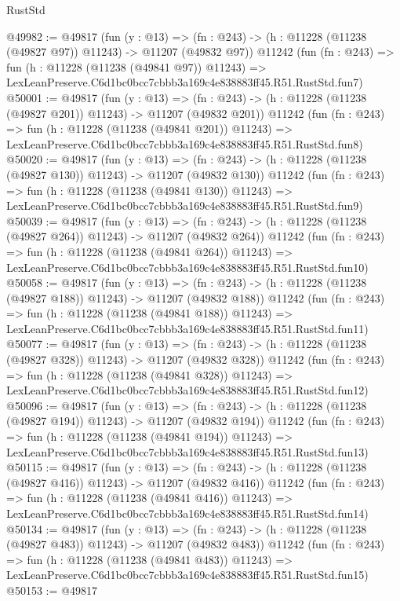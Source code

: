 \begin{lexlean}{RustStd}
\begin{coremodule}
@49982 := @49817
    (fun (y : @13) =>
    (fn : @243) -> (h : @11228 (@11238 (@49827 @97)) @11243) -> @11207 (@49832 @97))
    @11242
    (fun (fn : @243) =>
    fun (h : @11228 (@11238 (@49841 @97)) @11243) =>
    LexLeanPreserve.C6d1bc0bcc7cbbb3a169c4e838883ff45.R51.RustStd.fun7)
@50001 := @49817
    (fun (y : @13) =>
    (fn : @243) -> (h : @11228 (@11238 (@49827 @201)) @11243) -> @11207 (@49832 @201))
    @11242
    (fun (fn : @243) =>
    fun (h : @11228 (@11238 (@49841 @201)) @11243) =>
    LexLeanPreserve.C6d1bc0bcc7cbbb3a169c4e838883ff45.R51.RustStd.fun8)
@50020 := @49817
    (fun (y : @13) =>
    (fn : @243) -> (h : @11228 (@11238 (@49827 @130)) @11243) -> @11207 (@49832 @130))
    @11242
    (fun (fn : @243) =>
    fun (h : @11228 (@11238 (@49841 @130)) @11243) =>
    LexLeanPreserve.C6d1bc0bcc7cbbb3a169c4e838883ff45.R51.RustStd.fun9)
@50039 := @49817
    (fun (y : @13) =>
    (fn : @243) -> (h : @11228 (@11238 (@49827 @264)) @11243) -> @11207 (@49832 @264))
    @11242
    (fun (fn : @243) =>
    fun (h : @11228 (@11238 (@49841 @264)) @11243) =>
    LexLeanPreserve.C6d1bc0bcc7cbbb3a169c4e838883ff45.R51.RustStd.fun10)
@50058 := @49817
    (fun (y : @13) =>
    (fn : @243) -> (h : @11228 (@11238 (@49827 @188)) @11243) -> @11207 (@49832 @188))
    @11242
    (fun (fn : @243) =>
    fun (h : @11228 (@11238 (@49841 @188)) @11243) =>
    LexLeanPreserve.C6d1bc0bcc7cbbb3a169c4e838883ff45.R51.RustStd.fun11)
@50077 := @49817
    (fun (y : @13) =>
    (fn : @243) -> (h : @11228 (@11238 (@49827 @328)) @11243) -> @11207 (@49832 @328))
    @11242
    (fun (fn : @243) =>
    fun (h : @11228 (@11238 (@49841 @328)) @11243) =>
    LexLeanPreserve.C6d1bc0bcc7cbbb3a169c4e838883ff45.R51.RustStd.fun12)
@50096 := @49817
    (fun (y : @13) =>
    (fn : @243) -> (h : @11228 (@11238 (@49827 @194)) @11243) -> @11207 (@49832 @194))
    @11242
    (fun (fn : @243) =>
    fun (h : @11228 (@11238 (@49841 @194)) @11243) =>
    LexLeanPreserve.C6d1bc0bcc7cbbb3a169c4e838883ff45.R51.RustStd.fun13)
@50115 := @49817
    (fun (y : @13) =>
    (fn : @243) -> (h : @11228 (@11238 (@49827 @416)) @11243) -> @11207 (@49832 @416))
    @11242
    (fun (fn : @243) =>
    fun (h : @11228 (@11238 (@49841 @416)) @11243) =>
    LexLeanPreserve.C6d1bc0bcc7cbbb3a169c4e838883ff45.R51.RustStd.fun14)
@50134 := @49817
    (fun (y : @13) =>
    (fn : @243) -> (h : @11228 (@11238 (@49827 @483)) @11243) -> @11207 (@49832 @483))
    @11242
    (fun (fn : @243) =>
    fun (h : @11228 (@11238 (@49841 @483)) @11243) =>
    LexLeanPreserve.C6d1bc0bcc7cbbb3a169c4e838883ff45.R51.RustStd.fun15)
@50153 := @49817

\end{coremodule}
\end{lexlean}
